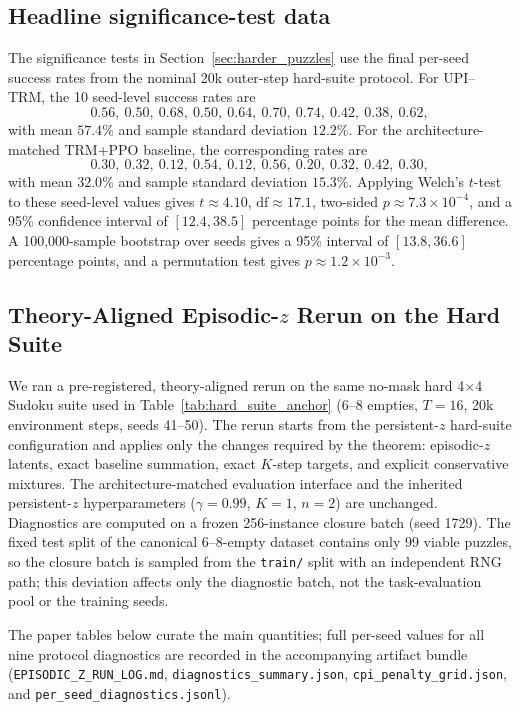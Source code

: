 \documentclass{article}
\theoremstyle{plain}
\theoremstyle{definition}
\theoremstyle{remark}
\begin{document}
\subsection{Headline significance-test data}
\label{app:headline_significance}

The significance tests in Section~\ref{sec:harder_puzzles} use the final per-seed success rates from the nominal 20k outer-step hard-suite protocol. For UPI--TRM, the 10 seed-level success rates are
\[
0.56,\ 0.50,\ 0.68,\ 0.50,\ 0.64,\ 0.70,\ 0.74,\ 0.42,\ 0.38,\ 0.62,
\]
with mean $57.4\%$ and sample standard deviation $12.2\%$. For the architecture-matched TRM+PPO baseline, the corresponding rates are
\[
0.30,\ 0.32,\ 0.12,\ 0.54,\ 0.12,\ 0.56,\ 0.20,\ 0.32,\ 0.42,\ 0.30,
\]
with mean $32.0\%$ and sample standard deviation $15.3\%$. Applying Welch's $t$-test to these seed-level values gives $t\approx 4.10$, $\mathrm{df}\approx 17.1$, two-sided $p\approx 7.3\times 10^{-4}$, and a 95\% confidence interval of $[12.4, 38.5]$ percentage points for the mean difference. A 100{,}000-sample bootstrap over seeds gives a 95\% interval of $[13.8, 36.6]$ percentage points, and a permutation test gives $p\approx 1.2\times 10^{-3}$.

\subsection{Theory-Aligned Episodic-$z$ Rerun on the Hard Suite}
\label{app:episodic_z_hard_suite_rerun}

We ran a pre-registered, theory-aligned rerun on the same no-mask hard 4$\times$4 Sudoku suite used in Table~\ref{tab:hard_suite_anchor} (6--8 empties, $T{=}16$, 20k environment steps, seeds 41--50). The rerun starts from the persistent-$z$ hard-suite configuration and applies only the changes required by the theorem: episodic-$z$ latents, exact baseline summation, exact $K$-step targets, and explicit conservative mixtures. The architecture-matched evaluation interface and the inherited persistent-$z$ hyperparameters ($\gamma{=}0.99$, $K{=}1$, $n{=}2$) are unchanged. Diagnostics are computed on a frozen 256-instance closure batch (seed 1729). The fixed test split of the canonical 6--8-empty dataset contains only 99 viable puzzles, so the closure batch is sampled from the \texttt{train/} split with an independent RNG path; this deviation affects only the diagnostic batch, not the task-evaluation pool or the training seeds.

The paper tables below curate the main quantities; full per-seed values for all nine protocol diagnostics are recorded in the accompanying artifact bundle (\texttt{EPISODIC\_Z\_RUN\_LOG.md}, \texttt{diagnostics\_summary.json}, \texttt{cpi\_penalty\_grid.json}, and \texttt{per\_seed\_diagnostics.jsonl}).
\end{document}
